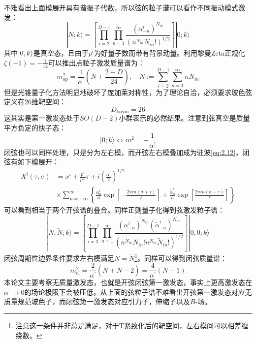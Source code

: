 不难看出上面模展开具有谐振子代数，所以弦的粒子谱可以看作不同振动模式激发：
\begin{equation}
	|N;k\rangle=\left[\prod_{i=2}^{D-1}\prod_{n=1}^\infty\frac{(\alpha_{-n}^i)^{N_{in}}}{(n^{N_{in}}N_{in}!)^{1/2}}\right]|0;k\rangle
\end{equation}
其中$\ket{0,k}$是真空态，且由于$p^i$为好量子数而带有背景动量。利用黎曼Zeta正规化$\zeta(-1)=-\frac{1}{12}$可以推出点粒子激发质量谱为：
\begin{equation}
	\label{eq:2.16}
	m^2_\mathrm{op}=\frac{1}{\alpha^{\prime}}\left(N+\frac{2-D}{24}\right),\quad N:=\sum_{i=2}^{D-1}\sum_{n=1}^{\infty}nN_{in}
\end{equation}
但是光锥量子化方法明显地破坏了庞加莱对称性，为了理论自洽，必须要求玻色弦定义在$26$维靶空间：
\begin{equation}
	\boxed{
		D_{\text{boson}}=26
	}
\end{equation}
这其实是第一激发态处于$SO(D-2)$小群表示的必然结果。注意到弦真空是质量平方负定的快子态：
\begin{equation}
	|0;k\rangle\Leftrightarrow m^2=-\frac{1}{\alpha^\prime}
\end{equation}
闭弦也可以同样处理，只是分为左右模，而开弦左右模叠加成为驻波\ref{eq:2.12}，闭弦有如下模展开：
\begin{equation}
	\label{eq:2.19}
	\begin{aligned}X^i(\tau,\sigma)&=x^i+\frac{p^i}{p^+}\tau+i\left(\frac{\alpha^{\prime}}{2}\right)^{1/2}\\&\times\sum_{n=-\infty}^\infty\left\{\frac{\alpha_n^i}{n}\exp\left[-\frac{2\pi in(\sigma+\tau)}{\ell}\right]+\frac{\tilde{\alpha}_n^i}{n}\exp\left[\frac{2\pi in(\sigma-\tau)}{\ell}\right]\right\}\end{aligned}
\end{equation}
可以看到相当于两个开弦谱的叠合。同样正则量子化得到弦激发粒子谱：
\begin{equation}
	|N,\tilde{N};k\rangle=\left[\prod_{i=2}^{D-1}\prod_{n=1}^\infty\frac{(\alpha_{-n}^i)^{N_{in}}(\tilde{\alpha}_{-n}^i)^{\tilde{N}_{in}}}{(n^{N_{in}}N_{in}!n^{\tilde{N}_{in}}\tilde{N}_{in}!)^{1/2}}\right]|0,0;k\rangle
\end{equation}
闭弦周期性边界条件要求左右模满足$N=\tilde{N}$\footnote{注意这一条件并非总是满足，对于T紧致化后的靶空间，左右模间可以相差缠绕数。}。同样可以得到闭弦质量谱：
\begin{equation}
	m^2_{\mathrm{cl}}=\frac{2}{\alpha^\prime}(N+\tilde{N}-2)=\frac{4}{\alpha^\prime}(N-1)
\end{equation}
本论文主要考察无质量激发态，也就是开弦闭弦第一激发态，事实上更高激发态在$\alpha^\prime\to0$的场论极限下会被压低。从上面的弦粒子谱不难看出开弦第一激发态对应无质量规范玻色子，而闭弦第一激发态对应引力子，伸缩子以及$B$-场。
